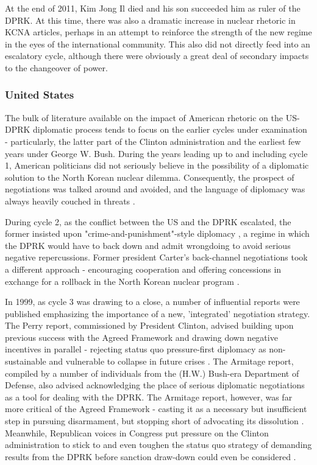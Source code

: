 \documentclass{article}
\begin{document}
At the end of 2011, Kim Jong Il died and his son succeeded him as ruler of the DPRK. At this time, there was also a dramatic increase in nuclear rhetoric in KCNA articles, perhaps in an attempt to reinforce the strength of the new regime in the eyes of the international community\cite{rich14}. This also did not directly feed into an escalatory cycle, although there were obviously a great deal of secondary impacts to the changeover of power.

\subsubsection{United States}

The bulk of literature available on the impact of American rhetoric on the US-DPRK diplomatic process tends to focus on the earlier cycles under examination - particularly, the latter part of the Clinton administration and the earliest few years under George W. Bush. During the years leading up to and including cycle 1, American politicians did not seriously believe in the possibility of a diplomatic solution to the North Korean nuclear dilemma. Consequently, the prospect of negotiations was talked around and avoided, and the language of diplomacy was always heavily couched in threats \cite{sigal}.

During cycle 2, as the conflict between the US and the DPRK escalated, the former insisted upon "crime-and-punishment"-style diplomacy \cite{bleiker}, a regime in which the DPRK would have to back down and admit wrongdoing to avoid serious negative repercussions. Former president Carter's back-channel negotiations took a different approach - encouraging cooperation and offering concessions in exchange for a rollback in the North Korean nuclear program \cite{sigal}.

In 1999, as cycle 3 was drawing to a close, a number of influential reports were published emphasizing the importance of a new, 'integrated' negotiation strategy. The Perry report, commissioned by President Clinton, advised building upon previous success with the Agreed Framework and drawing down negative incentives in parallel - rejecting status quo pressure-first diplomacy as non-sustainable and vulnerable to collapse in future crises \cite{perry}. The Armitage report, compiled by a number of individuals from the (H.W.) Bush-era Department of Defense, also advised acknowledging the place of serious diplomatic negotiations as a tool for dealing with the DPRK. The Armitage report, however, was far more critical of the Agreed Framework - casting it as a necessary but insufficient step in pursuing disarmament, but stopping short of advocating its dissolution \cite{armitage}. Meanwhile, Republican voices in Congress put pressure on the Clinton administration to stick to and even toughen the status quo strategy of demanding results from the DPRK before sanction draw-down could even be considered \cite{harnisch}. 
\end{document}
